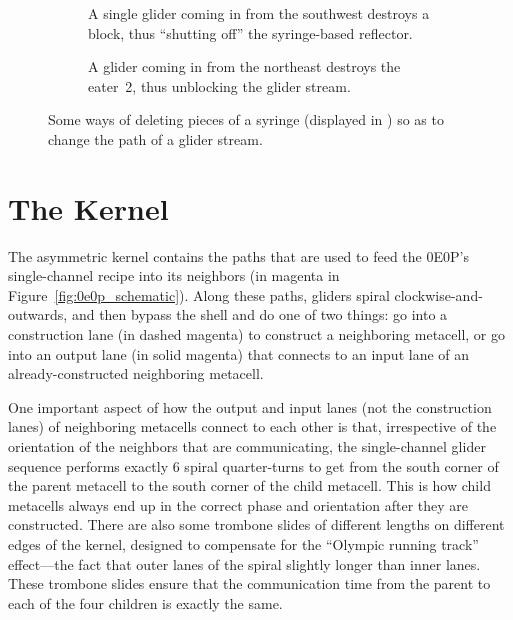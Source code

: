 \begin{figure}[!htb]
	\centering
	\begin{subfigure}{.535\textwidth}
		\centering
		\caption{A single glider coming in from the southwest destroys a block, thus ``shutting off'' the syringe-based reflector.}
		\label{fig:syringe_delete_block}
	\end{subfigure} \hfill \begin{subfigure}{.435\textwidth}
		\centering
		\caption{A glider coming in from the northeast destroys the eater~2, thus unblocking the glider stream.}
		\label{fig:syringe_delete_eater}
	\end{subfigure}
	\caption{Some ways of deleting pieces of a syringe (displayed in ) so as to change the path of a glider stream.}\label{fig:syringe_path_changer}
\end{figure}


\section{The Kernel}\label{sec:0e0p_structure_kernel}

The asymmetric kernel contains the paths that are used to feed the 0E0P's single-channel recipe into its neighbors (in magenta in Figure~\ref{fig:0e0p_schematic}). Along these paths, gliders spiral clockwise-and-outwards, and then bypass the shell and do one of two things: go into a construction lane (in dashed magenta) to construct a neighboring metacell, or go into an output lane (in solid magenta) that connects to an input lane of an already-constructed neighboring metacell.

One important aspect of how the output and input lanes (not the construction lanes) of neighboring metacells connect to each other is that, irrespective of the orientation of the neighbors that are communicating, the single-channel glider sequence performs exactly 6 spiral quarter-turns to get from the south corner of the parent metacell to the south corner of the child metacell. This is how child metacells always end up in the correct phase and orientation after they are constructed. There are also some trombone slides of different lengths on different edges of the kernel, designed to compensate for the ``Olympic running track'' effect---the fact that outer lanes of the spiral slightly longer than inner lanes. These trombone slides ensure that the communication time from the parent to each of the four children is exactly the same.

